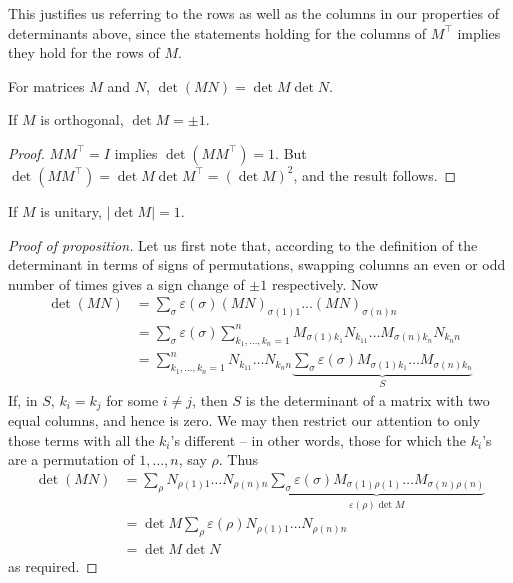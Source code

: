 \documentclass{../../template/note}
\begin{document}
    \begin{remark*}
        This justifies us referring to the rows as well as the columns in our properties of determinants above, since the statements holding for the columns of \(M^\intercal\) implies they hold for the rows of \(M\).
    \end{remark*}
    
    \begin{proposition}
        For matrices \(M\) and \(N\), \(\det(MN) = \det M \det N\).
    \end{proposition}
    
    \begin{corollary}
        If \(M\) is orthogonal, \(\det M = \pm 1\).
    \end{corollary}
    
    \begin{proof}
        \(MM^\intercal = I\) implies \(\det(MM^\intercal) = 1\). But \(\det(MM^\intercal) = \det M \det M^\intercal = (\det M)^2\), and the result follows.
    \end{proof}
    
    \begin{corollary}
        If \(M\) is unitary, \(|\det M| = 1\).
    \end{corollary}

    
    \begin{proof}[Proof of proposition]
        Let us first note that, according to the definition of the determinant in terms of signs of permutations, swapping columns an even or odd number of times gives a sign change of \(\pm 1\) respectively. Now
        \begin{align*}
            \det(MN) &= \sum_\sigma \varepsilon(\sigma) (MN)_{\sigma(1)1} \dots (MN)_{\sigma(n)n} \\
            &= \sum_\sigma \varepsilon(\sigma) \sum_{k_1, \dots, k_n = 1}^n M_{\sigma(1)k_1}N_{k_11}\dots M_{\sigma(n)k_n}N_{k_nn} \\
            &= \sum_{k_1, \dots, k_n = 1}^n N_{k_11}\dots N_{k_nn} \underbrace{\sum_\sigma \varepsilon(\sigma) M_{\sigma(1)k_1}\dots M_{\sigma(n)k_n}}_{S}
        \end{align*}
        If, in \(S\), \(k_i = k_j\) for some \(i \neq j\), then \(S\) is the determinant of a matrix with two equal columns, and hence is zero. We may then restrict our attention to only those terms with all the \(k_i\)'s different -- in other words, those for which the \(k_i\)'s are a permutation of \(1, \dots, n\), say \(\rho\). Thus
        \begin{align*}
            \det(MN) &= \sum_\rho N_{\rho(1)1} \dots N_{\rho(n)n} \underbrace{\sum_\sigma \varepsilon(\sigma) M_{\sigma(1)\rho(1)} \dots M_{\sigma(n)\rho(n)}}_{\varepsilon(\rho) \det M} \\
            &= \det M \sum_\rho \varepsilon(\rho) N_{\rho(1) 1} \dots N_{\rho(n) n} \\
            &= \det M \det N
        \end{align*}
        as required.
    \end{proof}
    
\end{document}
